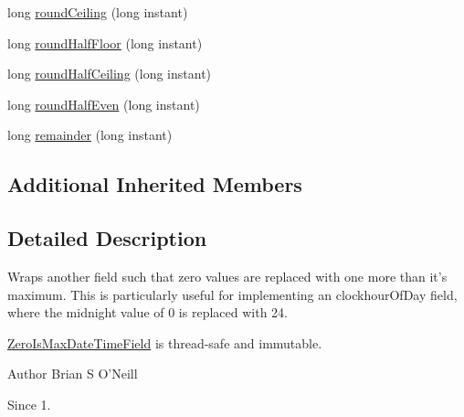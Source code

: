 \begin{DoxyCompactItemize}
long \hyperlink{classorg_1_1joda_1_1time_1_1field_1_1_zero_is_max_date_time_field_a560984c543b8f8be283f0d12916e38a5}{round\-Ceiling} (long instant)
\item 
long \hyperlink{classorg_1_1joda_1_1time_1_1field_1_1_zero_is_max_date_time_field_a750e83e76da50a1a0410f67f34c89a83}{round\-Half\-Floor} (long instant)
\item 
long \hyperlink{classorg_1_1joda_1_1time_1_1field_1_1_zero_is_max_date_time_field_a186a66fbe58aaddca795db8fcd922d8a}{round\-Half\-Ceiling} (long instant)
\item 
long \hyperlink{classorg_1_1joda_1_1time_1_1field_1_1_zero_is_max_date_time_field_a5db4bf1052a61d4bba36c8dfd4b2be92}{round\-Half\-Even} (long instant)
\item 
long \hyperlink{classorg_1_1joda_1_1time_1_1field_1_1_zero_is_max_date_time_field_a7566a3f052f35e508598d71ae42ab3db}{remainder} (long instant)
\end{DoxyCompactItemize}
\subsection*{Additional Inherited Members}


\subsection{Detailed Description}
Wraps another field such that zero values are replaced with one more than it's maximum. This is particularly useful for implementing an clockhour\-Of\-Day field, where the midnight value of 0 is replaced with 24. 

\hyperlink{classorg_1_1joda_1_1time_1_1field_1_1_zero_is_max_date_time_field}{Zero\-Is\-Max\-Date\-Time\-Field} is thread-\/safe and immutable.

\begin{DoxyAuthor}{Author}
Brian S O'Neill 
\end{DoxyAuthor}
\begin{DoxySince}{Since}
1. 
\end{DoxySince}


